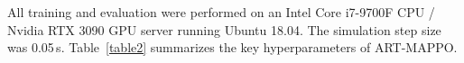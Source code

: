 \documentclass[lettersize,journal]{IEEEtran}
\newcommand{\hladd}[1]{{\color{blue}#1}}
\begin{document}
All training and evaluation were performed on an Intel Core i7-9700F CPU / Nvidia RTX 3090
GPU server running Ubuntu 18.04.
The simulation step size was 0.05\,s.
Table~\ref{table2} summarizes the key hyperparameters of ART-MAPPO.

\end{document}
